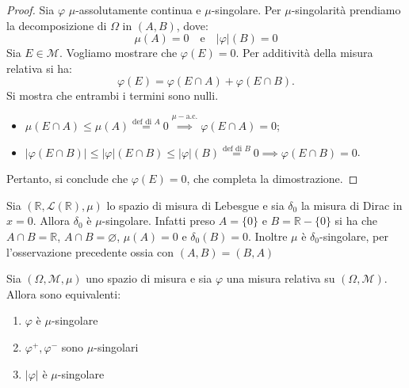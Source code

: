 \begin{proof}
    Sia \(\varphi\) \(\mu\)-assolutamente continua e \(\mu\)-singolare. Per \(\mu\)-singolarità prendiamo
    la decomposizione di \(\Omega\) in \((A, B)\), dove:
    \[\mu(A) = 0 \quad \text{e} \quad
    |\varphi|(B) = 0\]
    Sia \(E \in \mathcal{M}\). Vogliamo mostrare che \(\varphi(E) = 0\). Per additività della misura relativa si ha:
    \[\varphi(E) = \varphi(E \cap A) + \varphi(E \cap B).\]
    Si mostra che entrambi i termini sono nulli. 
    \begin{itemize}[label = --]
        \item  \(\mu (E \cap A) \le \mu(A) \stackrel{\text{def di } A}{=} 0
            \stackrel{\mu-\text{a.c.}}{\implies} \varphi(E \cap A) = 0\); \item
            \(|\varphi (E \cap B)| \le |\varphi|(E \cap B) \le |\varphi| (B)
            \stackrel{\text{def di } B}{=} 0 \implies \varphi(E \cap B)=0\).
    \end{itemize} Pertanto, si conclude che \(\varphi(E) = 0\), che completa la
    dimostrazione.
\end{proof}
\begin{example}
    Sia \((\mathbb{R}, \mathcal{L}(\mathbb{R}), \mu)\) lo spazio di misura di
    Lebesgue e sia \(\delta_0\) la misura di Dirac in \(x=0\). Allora
    \(\delta_0\) è \(\mu\)-singolare. Infatti preso \(A = \{0\} \) e
    \(B=\mathbb{R}-\{0\} \) si ha che \(A \cap B = \mathbb{R}\), \(A \cap B =
    \varnothing\), \(\mu(A) = 0\) e \(\delta_0(B) = 0\).
    Inoltre \(\mu\) è \(\delta_0\)-singolare, per l'osservazione precedente
    ossia con \((A, B) = (B, A)\) 
\end{example}
\begin{proposition}\label{prop:equivalenti_sing}
    Sia \((\Omega, \mathcal{M}, \mu)\) uno spazio di misura e sia \(\varphi \)
    una misura relativa su \((\Omega, \mathcal{M})\). Allora sono equivalenti:
    \begin{enumerate}[label = \roman*)]
        \item \(\varphi \) è \(\mu\)-singolare
        \item \(\varphi^{+}, \varphi^{-}\) sono \(\mu\)-singolari
        \item \(|\varphi|\) è \(\mu\)-singolare
    \end{enumerate}
\end{proposition}
